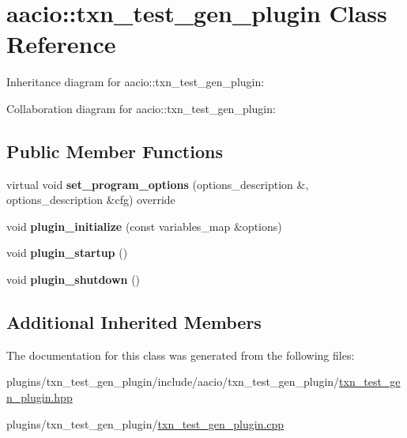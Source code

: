 \hypertarget{classaacio_1_1txn__test__gen__plugin}{}\section{aacio\+:\+:txn\+\_\+test\+\_\+gen\+\_\+plugin Class Reference}
\label{classaacio_1_1txn__test__gen__plugin}


Inheritance diagram for aacio\+:\+:txn\+\_\+test\+\_\+gen\+\_\+plugin\+:


Collaboration diagram for aacio\+:\+:txn\+\_\+test\+\_\+gen\+\_\+plugin\+:
\subsection*{Public Member Functions}
\begin{DoxyCompactItemize}
\item 
\mbox{\label{classaacio_1_1txn__test__gen__plugin_a5ff36d1dbce55704483a5a7e9884eaf3}} 
virtual void {\bfseries set\+\_\+program\+\_\+options} (options\+\_\+description \&, options\+\_\+description \&cfg) override
\item 
\mbox{\label{classaacio_1_1txn__test__gen__plugin_ad56d5618c4134deba5c1c6fb51548850}} 
void {\bfseries plugin\+\_\+initialize} (const variables\+\_\+map \&options)
\item 
\mbox{\label{classaacio_1_1txn__test__gen__plugin_a7c9048264b408de1a6f0b88241262718}} 
void {\bfseries plugin\+\_\+startup} ()
\item 
\mbox{\label{classaacio_1_1txn__test__gen__plugin_a275fbf5541a0e4d4b16f1aa85b7ddda9}} 
void {\bfseries plugin\+\_\+shutdown} ()
\end{DoxyCompactItemize}
\subsection*{Additional Inherited Members}


The documentation for this class was generated from the following files\+:\begin{DoxyCompactItemize}
\item 
plugins/txn\+\_\+test\+\_\+gen\+\_\+plugin/include/aacio/txn\+\_\+test\+\_\+gen\+\_\+plugin/\mbox{\hyperlink{txn__test__gen__plugin_8hpp}{txn\+\_\+test\+\_\+gen\+\_\+plugin.\+hpp}}\item 
plugins/txn\+\_\+test\+\_\+gen\+\_\+plugin/\mbox{\hyperlink{txn__test__gen__plugin_8cpp}{txn\+\_\+test\+\_\+gen\+\_\+plugin.\+cpp}}\end{DoxyCompactItemize}
